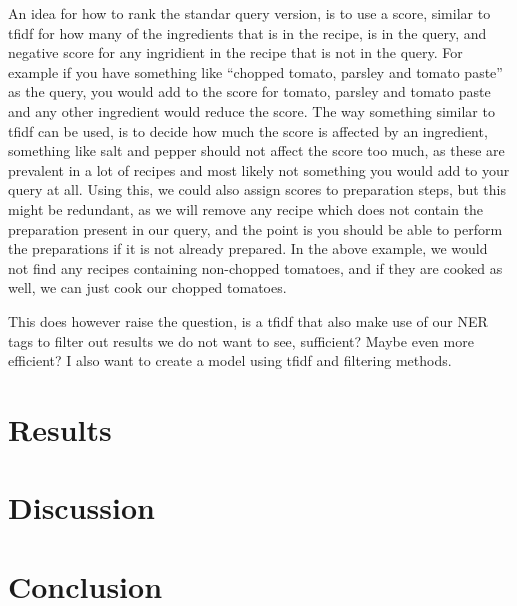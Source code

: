 \documentclass[11pt]{article}
\begin{document}
An idea for how to rank the standar query version, is to use a score, similar to
tfidf for how many of the ingredients that is in the recipe, is in the query,
and negative score for any ingridient in the recipe that is not in the query.
For example if you have something like ``chopped tomato, parsley and tomato
paste'' as the query, you would add to the score for tomato, parsley and tomato
paste and any other ingredient would reduce the score.
The way something similar to tfidf can be used, is to decide how much the score
is affected by an ingredient, something like salt and pepper should not affect
the score too much, as these are prevalent in a lot of recipes and most likely
not something you would add to your query at all.
Using this, we could also assign scores to preparation steps, but this might be
redundant, as we will remove any recipe which does not contain the preparation
present in our query, and the point is you should be able to perform the
preparations if it is not already prepared.
In the above example, we would not find any recipes containing non-chopped
tomatoes, and if they are cooked as well, we can just cook our chopped tomatoes.

This does however raise the question, is a tfidf that also make use of our NER
tags to filter out results we do not want to see, sufficient? Maybe even more
efficient?
I also want to create a model using tfidf and filtering methods.
\fi

\section{Results}
\section{Discussion}
\section{Conclusion}


\end{document}
